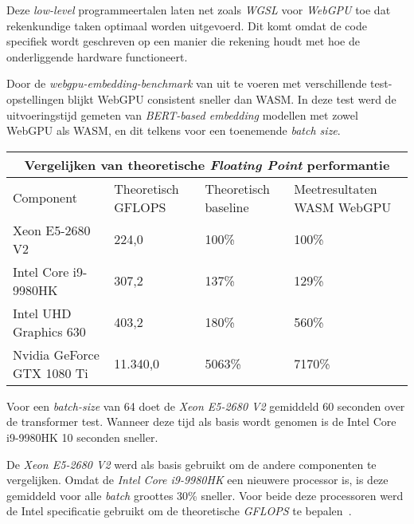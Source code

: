 \bigbreak{}

Deze \textit{low-level} programmeertalen laten net zoals \textit{WGSL} voor \textit{WebGPU} toe dat rekenkundige taken optimaal worden uitgevoerd. Dit komt omdat de code specifiek wordt geschreven op een manier die rekening houdt met hoe de onderliggende hardware functioneert.

\bigbreak{}


\label{sec:transformerbench}

Door de \textit{webgpu-embedding-benchmark} van \textcite{Lochner2024} uit te voeren met verschillende test-opstellingen blijkt WebGPU consistent sneller dan WASM. In deze test werd de uitvoeringstijd gemeten van \textit{BERT-based embedding} modellen met zowel WebGPU als WASM, en dit telkens voor een toenemende \textit{batch size}.

\break{}

\begin{tabular}{ |p{5cm}|p{3cm}|p{3cm}|p{3cm}|  }
    \hline
    \multicolumn{4}{|c|}{Vergelijken van theoretische \textit{Floating Point} performantie} \\
    \hline
    Component& Theoretisch GFLOPS & Theoretisch baseline & Meetresultaten WASM WebGPU\\
    \hline
        Xeon E5-2680 V2             & 224,0     & 100\%  & 100\%       \\
        Intel Core i9-9980HK        & 307,2     & 137\%  & 129\%    \\
        Intel UHD Graphics 630      & 403,2     & 180\%  & 560\%    \\
        Nvidia GeForce GTX 1080 Ti  & 11.340,0  & 5063\% & 7170\%   \\
    \hline
\end{tabular}

\bigbreak{}

Voor een \textit{batch-size} van 64 doet de \textit{Xeon E5-2680 V2} gemiddeld 60 seconden over de transformer test. Wanneer deze tijd als basis wordt genomen is de Intel Core i9-9980HK 10 seconden sneller.

\bigbreak{}

De \textit{Xeon E5-2680 V2} werd als basis gebruikt om de andere componenten te vergelijken. Omdat de \textit{Intel Core i9-9980HK} een nieuwere processor is, is deze gemiddeld voor alle \textit{batch} groottes 30\% sneller. Voor beide deze processoren werd de Intel specificatie gebruikt om de theoretische \textit{GFLOPS} te bepalen~\autocite{Intel2024, Intel2024a}.

